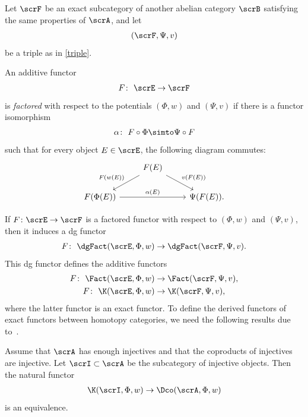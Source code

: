 Let $\scrF$ be an exact subcategory of another abelian category $\scrB$ satisfying the same properties of $\scrA$, and let
\begin{gather*}
(\scrF,\Psi,v)
\end{gather*} be a triple as in \eqref{triple}.

\begin{dfn} An additive functor
\begin{gather*}
F\colon\ \scrE \to \scrF
\end{gather*}
is {\it factored} with respect to the potentials $(\Phi,w)$ and $(\Psi,v)$ if there is a functor isomorphism
\begin{gather*}
\alpha\colon\ F\circ \Phi \simto \Psi\circ F
\end{gather*}
such that for every object $E\in \scrE$, the following diagram commutes:
\[
\begin{tikzcd}
&F(E)\arrow[ld, "F(w(E))"']\arrow[rd, "v(F(E))"]&\\
F(\Phi(E))\arrow[rr, "\alpha(E)"]&& \Psi(F(E)).
\end{tikzcd}
\]
\end{dfn}

If $F\colon \scrE \to \scrF$ is a factored functor with respect to $(\Phi,w)$ and $(\Psi,v)$, then it induces a dg functor
\begin{gather*}
F\colon\ \dgFact(\scrE,\Phi,w)\to\dgFact(\scrF,\Psi,v).
\end{gather*}
This dg functor defines the additive functors
\begin{gather*}
F\colon\ \Fact(\scrE,\Phi,w)\to\Fact(\scrF,\Psi,v),
\\
F\colon\ \K(\scrE,\Phi,w)\to\K(\scrF,\Psi,v),
\end{gather*}
where the latter functor is an exact functor. To define the derived functors of exact functors between homotopy categories, we need the following results due to~\cite{bdfik}.

\begin{prop}\label{inj resol}
Assume that $\scrA$ has enough injectives and that the coproducts of injectives are injective. Let $\scrI\subset \scrA$ be the subcategory of injective objects. Then the natural functor
\begin{gather*}
\K(\scrI,\Phi,w)\to\Dco(\scrA,\Phi,w)
\end{gather*}
is an equivalence.
\end{prop}

